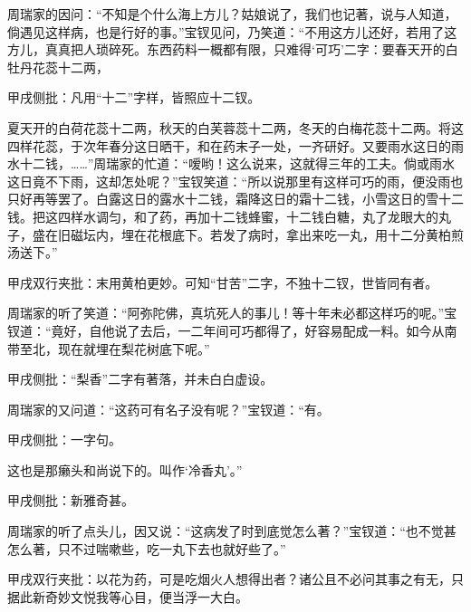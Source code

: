 \begin{parag}
    周瑞家的因问：“不知是个什么海上方儿？姑娘说了，我们也记著，说与人知道，倘遇见这样病，也是行好的事。”宝钗见问，乃笑道：“不用这方儿还好，若用了这方儿，真真把人琐碎死。东西药料一概都有限，只难得‘可巧’二字：要春天开的白牡丹花蕊十二两，\begin{note}甲戌侧批：凡用“十二”字样，皆照应十二钗。\end{note}夏天开的白荷花蕊十二两，秋天的白芙蓉蕊十二两，冬天的白梅花蕊十二两。将这四样花蕊，于次年春分这日晒干，和在药末子一处，一齐研好。又要雨水这日的雨水十二钱，……”周瑞家的忙道：“嗳哟！这么说来，这就得三年的工夫。倘或雨水这日竟不下雨，这却怎处呢？”宝钗笑道：“所以说那里有这样可巧的雨，便没雨也只好再等罢了。白露这日的露水十二钱，霜降这日的霜十二钱，小雪这日的雪十二钱。把这四样水调匀，和了药，再加十二钱蜂蜜，十二钱白糖，丸了龙眼大的丸子，盛在旧磁坛内，埋在花根底下。若发了病时，拿出来吃一丸，用十二分黄柏煎汤送下。”\begin{note}甲戌双行夹批：末用黄柏更妙。可知“甘苦”二字，不独十二钗，世皆同有者。\end{note}
\end{parag}


\begin{parag}
    周瑞家的听了笑道：“阿弥陀佛，真坑死人的事儿！等十年未必都这样巧的呢。”宝钗道：“竟好，自他说了去后，一二年间可巧都得了，好容易配成一料。如今从南带至北，现在就埋在梨花树底下呢。”\begin{note}甲戌侧批：“梨香”二字有著落，并未白白虚设。\end{note}周瑞家的又问道：“这药可有名子没有呢？”宝钗道：“有。\begin{note}甲戌侧批：一字句。\end{note}这也是那癞头和尚说下的。叫作‘冷香丸’。”\begin{note}甲戌侧批：新雅奇甚。\end{note}周瑞家的听了点头儿，因又说：“这病发了时到底觉怎么著？”宝钗道：“也不觉甚怎么著，只不过喘嗽些，吃一丸下去也就好些了。”\begin{note}甲戌双行夹批：以花为药，可是吃烟火人想得出者？诸公且不必问其事之有无，只据此新奇妙文悦我等心目，便当浮一大白。\end{note}
\end{parag}


